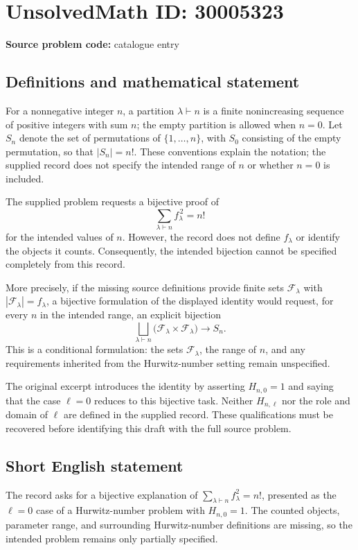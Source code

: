\documentclass[11pt]{article}
\begin{document}
\section*{UnsolvedMath ID: 30005323}
\textbf{Source problem code:} catalogue entry
\subsection{Definitions and mathematical statement}
For a nonnegative integer \(n\), a partition \(\lambda\vdash n\) is a finite nonincreasing sequence of positive integers with sum \(n\); the empty partition is allowed when \(n=0\). Let \(S_n\) denote the set of permutations of \(\{1,\ldots,n\}\), with \(S_0\) consisting of the empty permutation, so that \(|S_n|=n!\). These conventions explain the notation; the supplied record does not specify the intended range of \(n\) or whether \(n=0\) is included.

The supplied problem requests a bijective proof of
\[
\sum_{\lambda\vdash n} f_\lambda^{\,2}=n!
\]
for the intended values of \(n\). However, the record does not define \(f_\lambda\) or identify the objects it counts. Consequently, the intended bijection cannot be specified completely from this record.

More precisely, if the missing source definitions provide finite sets \(\mathcal F_\lambda\) with \(|\mathcal F_\lambda|=f_\lambda\), a bijective formulation of the displayed identity would request, for every \(n\) in the intended range, an explicit bijection
\[
\bigsqcup_{\lambda\vdash n}
\bigl(\mathcal F_\lambda\times\mathcal F_\lambda\bigr)
\longrightarrow S_n.
\]
This is a conditional formulation: the sets \(\mathcal F_\lambda\), the range of \(n\), and any requirements inherited from the Hurwitz-number setting remain unspecified.

The original excerpt introduces the identity by asserting \(H_{n,0}=1\) and saying that the case \(\ell=0\) reduces to this bijective task. Neither \(H_{n,\ell}\) nor the role and domain of \(\ell\) are defined in the supplied record. These qualifications must be recovered before identifying this draft with the full source problem.
\subsection{Short English statement}
The record asks for a bijective explanation of \(\sum_{\lambda\vdash n}f_\lambda^2=n!\), presented as the \(\ell=0\) case of a Hurwitz-number problem with \(H_{n,0}=1\). The counted objects, parameter range, and surrounding Hurwitz-number definitions are missing, so the intended problem remains only partially specified.
\end{document}
